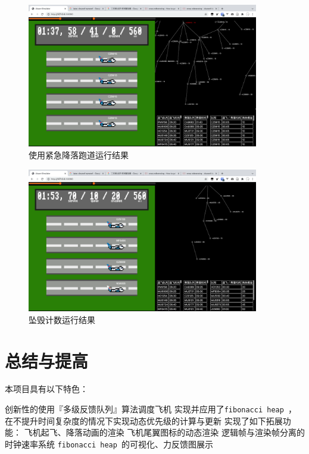 \documentclass{ctexart}
\newcommand{\fibheap}{\texttt{fibonacci heap }}
\begin{document}
\begin{figure}[htp]
    \centering
    \includegraphics[width=0.9\textwidth]{images/test-crash-2}
    \caption{使用紧急降落跑道\quad 运行结果}
    \label{fig:test-crash-2}
\end{figure}

\begin{figure}[htp]
    \centering
    \includegraphics[width=0.9\textwidth]{images/test-crash-3}
    \caption{坠毁计数\quad 运行结果}
    \label{fig:test-crash-3}
\end{figure}

\section{总结与提高}
本项目具有以下特色：
\begin{outline}
    \1 创新性的使用『多级反馈队列』算法调度飞机
    \1 实现并应用了\fibheap ， 在不提升时间复杂度的情况下实现动态优先级的计算与更新
    \1 实现了如下拓展功能：
        \2 飞机起飞、降落动画的渲染
        \2 飞机尾翼图标的动态渲染
        \2 逻辑帧与渲染帧分离的时钟速率系统
        \2 \fibheap 的可视化、力反馈图展示
\end{outline}
\end{document}
